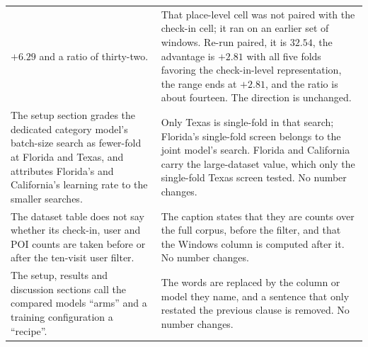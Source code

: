 \begin{table}[htb]
\begin{tabular}{@{}p{}p{}@{}}
$+6.29$ and a ratio of thirty-two. &
That place-level cell was not paired with the check-in cell; it
ran on an earlier set of windows. Re-run paired, it is $32.54$,
the advantage is $+2.81$ with all five folds favoring the
check-in-level representation, the range ends at $+2.81$, and
the ratio is about fourteen. The direction is unchanged. \\
\addlinespace
The setup section grades the dedicated category model's
batch-size search as fewer-fold at Florida and Texas, and
attributes Florida's and California's learning rate to the
smaller searches. &
Only Texas is single-fold in that search; Florida's single-fold
screen belongs to the joint model's search. Florida and
California carry the large-dataset value, which only the
single-fold Texas screen tested. No number changes. \\
\addlinespace
The dataset table does not say whether its check-in, user and
POI counts are taken before or after the ten-visit user
filter. &
The caption states that they are counts over the full corpus,
before the filter, and that the Windows column is computed
after it. No number changes. \\
\addlinespace
The setup, results and discussion sections call the compared
models ``arms'' and a training configuration a ``recipe''. &
The words are replaced by the column or model they name, and a
sentence that only restated the previous clause is removed. No
number changes. \\
\bottomrule
\end{tabular}
\end{table}
